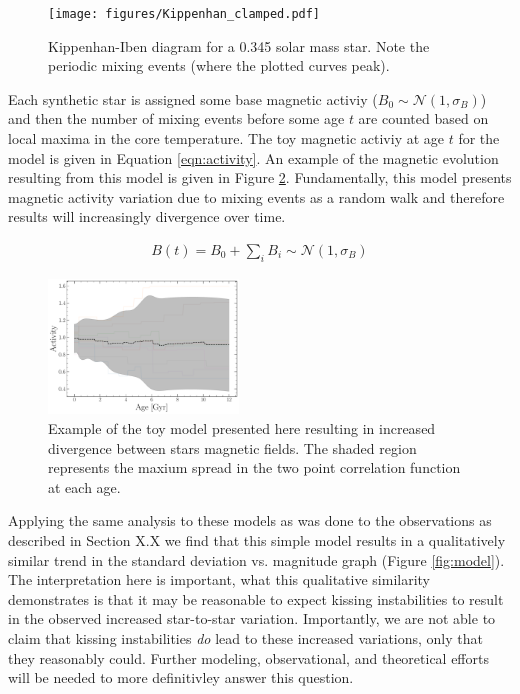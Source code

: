 \begin{figure}
  \centering
  \texttt{[image: figures/Kippenhan\_clamped.pdf]}
  \caption{Kippenhan-Iben diagram for a 0.345 solar mass star. Note the
  periodic mixing events (where the plotted curves peak).}
  \label{fig:kippenhan}
\end{figure}

Each synthetic star is assigned some base magnetic activiy ($B_{0} \sim
\mathcal{N}(1, \sigma_{B})$) and then the number of mixing events before some age $t$
are counted based on local maxima in the core temperature. The toy magnetic
activiy at age $t$ for the model is given in Equation \ref{eqn:activity}. An
example of the magnetic evolution resulting from this model is given in Figure
\ref{fig:simpleB}. Fundamentally, this model presents magnetic
activity variation due to mixing events as a random walk and therefore results will
increasingly divergence over time.

\begin{align}\label{eqn:activity}
  B(t) = B_{0} + \sum_{i}B_{i} \sim \mathcal{N}(1, \sigma_{B}) 
\end{align}

\begin{figure}
  \centering
  \includegraphics[width=0.45\textwidth]{figures/simpleBEvolution.pdf}
  \caption{Example of the toy model presented here resulting in increased
  divergence between stars magnetic fields. The shaded region represents the
  maxium spread in the two point correlation function at each age.}
  \label{fig:simpleB}
\end{figure}

Applying the same analysis to these models as was done to the observations as
described in Section {\color{red} X.X} we find that this simple model results
in a qualitatively similar trend in the standard deviation vs. magnitude graph
(Figure \ref{fig:model}). The interpretation here is important, what this
qualitative similarity demonstrates is that it may be reasonable to expect
kissing instabilities to result in the observed increased star-to-star
variation. Importantly, we are not able to claim that kissing instabilities
\textit{do} lead to these increased variations, only that they reasonably
could. Further modeling, observational, and theoretical efforts will be needed
to more definitivley answer this question.

